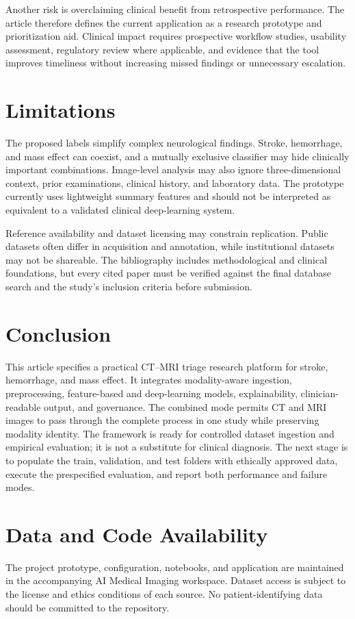 \documentclass[10pt,a4paper]{article}
\begin{document}
Another risk is overclaiming clinical benefit from retrospective performance. The article therefore defines the current application as a research prototype and prioritization aid. Clinical impact requires prospective workflow studies, usability assessment, regulatory review where applicable, and evidence that the tool improves timeliness without increasing missed findings or unnecessary escalation.

\section{Limitations}
The proposed labels simplify complex neurological findings. Stroke, hemorrhage, and mass effect can coexist, and a mutually exclusive classifier may hide clinically important combinations. Image-level analysis may also ignore three-dimensional context, prior examinations, clinical history, and laboratory data. The prototype currently uses lightweight summary features and should not be interpreted as equivalent to a validated clinical deep-learning system.

Reference availability and dataset licensing may constrain replication. Public datasets often differ in acquisition and annotation, while institutional datasets may not be shareable. The bibliography includes methodological and clinical foundations, but every cited paper must be verified against the final database search and the study's inclusion criteria before submission.

\section{Conclusion}
This article specifies a practical CT--MRI triage research platform for stroke, hemorrhage, and mass effect. It integrates modality-aware ingestion, preprocessing, feature-based and deep-learning models, explainability, clinician-readable output, and governance. The combined mode permits CT and MRI images to pass through the complete process in one study while preserving modality identity. The framework is ready for controlled dataset ingestion and empirical evaluation; it is not a substitute for clinical diagnosis. The next stage is to populate the train, validation, and test folders with ethically approved data, execute the prespecified evaluation, and report both performance and failure modes.

\section*{Data and Code Availability}
The project prototype, configuration, notebooks, and application are maintained in the accompanying AI Medical Imaging workspace. Dataset access is subject to the license and ethics conditions of each source. No patient-identifying data should be committed to the repository.
\end{document}
